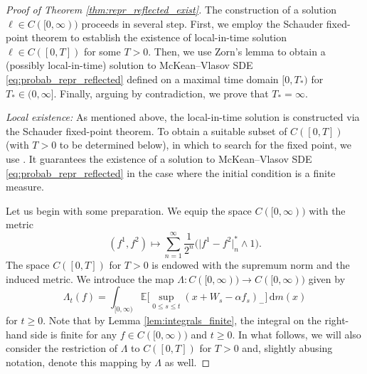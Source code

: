 \documentclass[11pt, a4paper]{article}
\theoremstyle{plain}
\theoremstyle{definition}
\theoremstyle{remark}
\numberwithin{equation}{section}
\newcommand{\ev}{\mathbb{E}}
\renewcommand{\d}{\mathrm{d}}
\newcommand{\define}{\mathpunct{:}}
\begin{document}
\begin{proof}[Proof of Theorem \ref{thm:repr_reflected_exist}]
The construction of a solution $\ell \in C([0, \infty))$ proceeds in several step. First, we employ the Schauder fixed-point theorem to establish the existence of local-in-time solution $\ell \in C([0, T])$ for some $T > 0$. Then, we use Zorn's lemma to obtain a (possibly local-in-time) solution to McKean--Vlasov SDE \eqref{eq:probab_repr_reflected} defined on a maximal time domain $[0, T_{\ast})$ for $T_{\ast} \in (0, \infty]$. Finally, arguing by contradiction, we prove that $T_{\ast} = \infty$.

\textit{Local existence:} As mentioned above, the local-in-time solution is constructed via the Schauder fixed-point theorem. To obtain a suitable subset of $C([0, T])$ (with $T > 0$ to be determined below), in which to search for the fixed point, we use \cite[Theorem 1.12]{baker_loc_times_2025}. It guarantees the existence of a solution to McKean--Vlasov SDE \eqref{eq:probab_repr_reflected} in the case where the initial condition is a finite measure. 

Let us begin with some preparation. 
We equip the space $C([0, \infty))$ with the metric
\begin{equation*}
    (f^1, f^2) \mapsto \sum_{n = 1}^{\infty} \frac{1}{2^n} \bigl(\lvert f^1 - f^2\rvert^{\ast}_n \land 1\bigr).
\end{equation*}
The space $C([0, T])$ for $T > 0$ is endowed with the supremum norm and the induced metric. We introduce the map $\Lambda \define C([0, \infty)) \to C([0, \infty))$ given by
\begin{equation} \label{eq:fixed_point_map}
    \Lambda_t(f) = \int_{[0, \infty)} \ev\biggl[\sup_{0 \leq s \leq t} (x + W_s - \alpha f_s)_-\biggr] \, \d m(x)
\end{equation}
for $t \geq 0$. Note that by Lemma \ref{lem:integrals_finite}, the integral on the right-hand side is finite for any $f \in C([0, \infty))$ and $t \geq 0$. In what follows, we will also consider the restriction of $\Lambda$ to $C([0, T])$ for $T > 0$ and, slightly abusing notation, denote this mapping by $\Lambda$ as well.


\end{proof}
\end{document}
